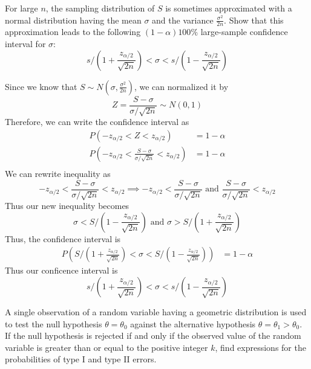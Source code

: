 \documentclass[answers,12pt,addpoints]{exam}
\begin{document}
\begin{questions}
    For large \(n\), the sampling distribution of \(S\) is sometimes approximated with a normal distribution having the mean \(\sigma\) and the variance \(\frac{\sigma^2}{2n}\). Show that this approximation leads to the following \((1 - \alpha)100\%\) large-sample confidence interval for \(\sigma\):
    \[
    s / \left(1 + \frac{z_{\alpha/2}}{\sqrt{2n}}\right) < \sigma < s / \left(1 - \frac{z_{\alpha/2}}{\sqrt{2n}}\right)
    \]
    \begin{solution}
        Since we know that $S \sim N(\sigma, \frac{\sigma^2}{2n})$, we can normalized it by
        \[Z = \frac{S-\sigma}{\sigma/ \sqrt{2n}} \sim N(0,1)\]
        Therefore, we can write the confidence interval as
        \begin{align*}
            P \left( -z_{\alpha/2} < Z < z_{\alpha/2} \right) &= 1 - \alpha \\
            P \left( -z_{\alpha/2} < \frac{S-\sigma}{\sigma/ \sqrt{2n}} < z_{\alpha/2} \right) &= 1 - \alpha \\
        \end{align*}
        We can rewrite inequality as
        $$ -z_{\alpha/2} < \frac{S-\sigma}{\sigma/ \sqrt{2n}} < z_{\alpha/2} \implies -z_{\alpha/2} < \frac{S-\sigma}{\sigma/ \sqrt{2n}} \text{ and } \frac{S-\sigma}{\sigma/ \sqrt{2n}} < z_{\alpha/2}$$
        Thus our new inequality becomes
        $$ \sigma < S / \left(1 - \frac{z_{\alpha/2}}{\sqrt{2n}}\right) \text{ and } \sigma > S / \left(1 + \frac{z_{\alpha/2}}{\sqrt{2n}}\right)$$
        Thus, the confidence interval is
        \begin{align*}
            P(S / \left(1 + \frac{z_{\alpha/2}}{\sqrt{2n}}\right) < \sigma < S / \left(1 - \frac{z_{\alpha/2}}{\sqrt{2n}}\right)) &= 1 - \alpha
        \end{align*}
        Thus our conficence interval is
        \[s / \left(1 + \frac{z_{\alpha/2}}{\sqrt{2n}}\right) < \sigma < s / \left(1 - \frac{z_{\alpha/2}}{\sqrt{2n}}\right)\]
    \end{solution}

    A single observation of a random variable having a geometric distribution is used to test the null hypothesis \(\theta = \theta_0\) against the alternative hypothesis \(\theta = \theta_1 > \theta_0\). If the null hypothesis is rejected if and only if the observed value of the random variable is greater than or equal to the positive integer \(k\), find expressions for the probabilities of type I and type II errors.


\end{questions}
\end{document}
